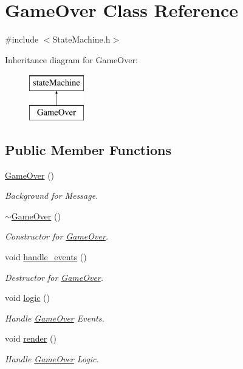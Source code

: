 \hypertarget{class_game_over}{\section{Game\-Over Class Reference}
\label{class_game_over}
}


{\ttfamily \#include $<$State\-Machine.\-h$>$}

Inheritance diagram for Game\-Over\-:\begin{figure}[H]
\begin{center}
\leavevmode
\includegraphics[height=2.000000cm]{class_game_over}
\end{center}
\end{figure}
\subsection*{Public Member Functions}
\begin{DoxyCompactItemize}
\item 
\hyperlink{class_game_over_a0ff11ac73026d574c5b393e825f10a1b}{Game\-Over} ()
\begin{DoxyCompactList}\small\item\em Background for Message. \end{DoxyCompactList}\item 
\hyperlink{class_game_over_ae36951a153d25d52fab7cbc7a85bbbbd}{$\sim$\-Game\-Over} ()
\begin{DoxyCompactList}\small\item\em Constructor for \hyperlink{class_game_over}{Game\-Over}. \end{DoxyCompactList}\item 
void \hyperlink{class_game_over_ac983ca4c0d92982da2f27a1a3758d91e}{handle\-\_\-events} ()
\begin{DoxyCompactList}\small\item\em Destructor for \hyperlink{class_game_over}{Game\-Over}. \end{DoxyCompactList}\item 
void \hyperlink{class_game_over_a4ff51266107ff11b3b10a2e0187eb3f6}{logic} ()
\begin{DoxyCompactList}\small\item\em Handle \hyperlink{class_game_over}{Game\-Over} Events. \end{DoxyCompactList}\item 
void \hyperlink{class_game_over_acaf9a4bea8b0e3e051d58b9ff4c80bec}{render} ()
\begin{DoxyCompactList}\small\item\em Handle \hyperlink{class_game_over}{Game\-Over} Logic. \end{DoxyCompactList}\end{DoxyCompactItemize}


